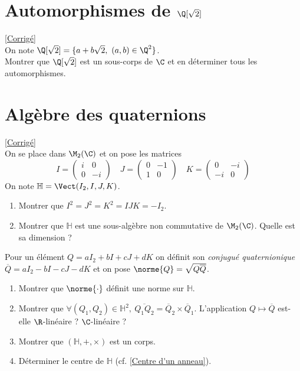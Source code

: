 \documentclass[8pt]{book}
\begin{document}
	\section{Automorphismes de $\Q[\sqrt{2}]$ }
	\label{Automorphismes de Qsqrt2}
	\textcolor{blue}{\hyperref[Automorphismes de Qsqrt2 corrigé]{[Corrigé]}}\\
	On note $\Q[\sqrt 2]=\{a+b\sqrt 2,\ (a,b)\in \Q^2\}$.\\
	Montrer que $\Q[\sqrt 2]$ est un sous-corps de $\C$ et en déterminer tous les automorphismes.
	
	\section{Algèbre des quaternions}
	\label{Algèbre des quaternions}
	\textcolor{blue}{\hyperref[Algèbre des quaternions corrigé]{[Corrigé]}}\\
	On se place dans $\M_2(\C)$ et on pose les matrices
	$$I=\begin{pmatrix}i&0\\0&-i\end{pmatrix}\quad J=\begin{pmatrix}0&-1\\1&0\end{pmatrix}\quad K=\begin{pmatrix}0&-i\\-i&0\end{pmatrix}$$
	On note $\mathbb H=\Vect(I_2,I,J,K)$.
	\begin{enumerate}
		\item Montrer que $I^2=J^2=K^2=IJK=-I_2$.
		\item Montrer que $\mathbb H$ est une sous-algèbre non commutative de $\M_2(\C)$. Quelle est sa dimension ?
	\end{enumerate}
	Pour un élément $Q=aI_2+bI+cJ+dK$ on définit son \textit{conjugué quaternionique} $\overline Q=aI_2-bI-cJ-dK$ et on pose $\norme{Q}=\sqrt{Q\overline Q}$.
	\begin{enumerate}[resume]
		\item Montrer que $\norme{\cdot}$ définit une norme sur $\mathbb H$.
		\item Montrer que $\forall (Q_1,Q_2)\in \mathbb H^2,\ \overline{Q_1Q_2}=\overline Q_2\times\overline Q_1$. L'application $Q\mapsto \overline Q$ est-elle $\R$-linéaire ? $\C$-linéaire ?
		\item Montrer que $(\mathbb H,+,\times)$ est un corps.
		\item Déterminer le centre de $\mathbb H$ (cf. \ref{Centre d'un anneau}).
	\end{enumerate}
	
\end{document}
